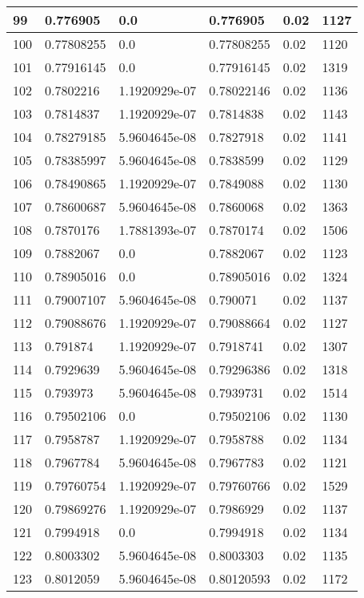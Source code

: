 \begin{longtable}{|l|l|l|l|l|l|}
99 & 0.776905 & 0.0 & 0.776905 & 0.02 & 1127 \\ \hline 
100 & 0.77808255 & 0.0 & 0.77808255 & 0.02 & 1120 \\ \hline 
101 & 0.77916145 & 0.0 & 0.77916145 & 0.02 & 1319 \\ \hline 
102 & 0.7802216 & 1.1920929e-07 & 0.78022146 & 0.02 & 1136 \\ \hline 
103 & 0.7814837 & 1.1920929e-07 & 0.7814838 & 0.02 & 1143 \\ \hline 
104 & 0.78279185 & 5.9604645e-08 & 0.7827918 & 0.02 & 1141 \\ \hline 
105 & 0.78385997 & 5.9604645e-08 & 0.7838599 & 0.02 & 1129 \\ \hline 
106 & 0.78490865 & 1.1920929e-07 & 0.7849088 & 0.02 & 1130 \\ \hline 
107 & 0.78600687 & 5.9604645e-08 & 0.7860068 & 0.02 & 1363 \\ \hline 
108 & 0.7870176 & 1.7881393e-07 & 0.7870174 & 0.02 & 1506 \\ \hline 
109 & 0.7882067 & 0.0 & 0.7882067 & 0.02 & 1123 \\ \hline 
110 & 0.78905016 & 0.0 & 0.78905016 & 0.02 & 1324 \\ \hline 
111 & 0.79007107 & 5.9604645e-08 & 0.790071 & 0.02 & 1137 \\ \hline 
112 & 0.79088676 & 1.1920929e-07 & 0.79088664 & 0.02 & 1127 \\ \hline 
113 & 0.791874 & 1.1920929e-07 & 0.7918741 & 0.02 & 1307 \\ \hline 
114 & 0.7929639 & 5.9604645e-08 & 0.79296386 & 0.02 & 1318 \\ \hline 
115 & 0.793973 & 5.9604645e-08 & 0.7939731 & 0.02 & 1514 \\ \hline 
116 & 0.79502106 & 0.0 & 0.79502106 & 0.02 & 1130 \\ \hline 
117 & 0.7958787 & 1.1920929e-07 & 0.7958788 & 0.02 & 1134 \\ \hline 
118 & 0.7967784 & 5.9604645e-08 & 0.7967783 & 0.02 & 1121 \\ \hline 
119 & 0.79760754 & 1.1920929e-07 & 0.79760766 & 0.02 & 1529 \\ \hline 
120 & 0.79869276 & 1.1920929e-07 & 0.7986929 & 0.02 & 1137 \\ \hline 
121 & 0.7994918 & 0.0 & 0.7994918 & 0.02 & 1134 \\ \hline 
122 & 0.8003302 & 5.9604645e-08 & 0.8003303 & 0.02 & 1135 \\ \hline 
123 & 0.8012059 & 5.9604645e-08 & 0.80120593 & 0.02 & 1172 \\ \hline 

\end{longtable}
